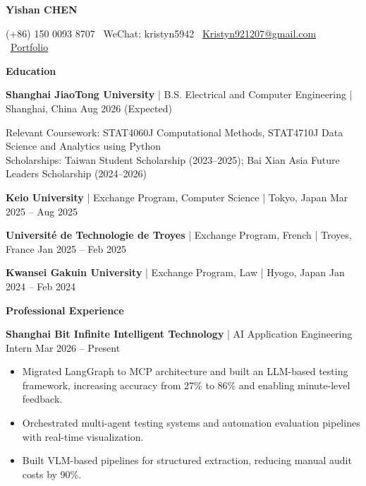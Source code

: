 \documentclass[11pt]{article}
\begin{document}
\begin{center}
    \textbf{\large Yishan CHEN}
\end{center}

\vspace{-20pt}
\begin{center}
    (+86) 150 0093 8707 \textbullet\
    WeChat: kristyn5942 \textbullet\
    \href{mailto:Kristyn921207@gmail.com}{Kristyn921207@gmail.com} \textbullet\
    \href{https://kristynchen.github.io/Personal-Website/}{Portfolio}
\end{center}

\vspace{-10pt}
\begin{center}
    \textbf{Education} \\
    \vspace{-5pt}
    \hrulefill
\end{center}
\vspace{-5pt}

\textbf{Shanghai JiaoTong University} | B.S. Electrical and Computer Engineering | Shanghai, China 
\hfill Aug 2026 (Expected)

Relevant Coursework: STAT4060J Computational Methods, STAT4710J Data Science and Analytics using Python \\
Scholarships: Taiwan Student Scholarship (2023--2025); Bai Xian Asia Future Leaders Scholarship (2024--2026)

\vspace{2pt}
\textbf{Keio University} | Exchange Program, Computer Science | Tokyo, Japan 
\hfill Mar 2025 -- Aug 2025  

\vspace{2pt}
\textbf{Université de Technologie de Troyes} | Exchange Program, French | Troyes, France 
\hfill Jan 2025 -- Feb 2025  

\vspace{2pt}
\textbf{Kwansei Gakuin University} | Exchange Program, Law | Hyogo, Japan 
\hfill Jan 2024 -- Feb 2024

\vspace{-5pt}
\begin{center}
    \textbf{Professional Experience} \\
    \vspace{-5pt}
    \hrulefill
\end{center}
\vspace{-5pt}

\textbf{Shanghai Bit Infinite Intelligent Technology} | AI Application Engineering Intern \hfill Mar 2026 -- Present  
\begin{itemize}[itemsep=0pt, parsep=0pt, topsep=0pt, partopsep=0pt, leftmargin=15pt]
    \item Migrated LangGraph to MCP architecture and built an LLM-based testing framework, increasing accuracy from 27\% to 86\% and enabling minute-level feedback.
    \item Orchestrated multi-agent testing systems and automation evaluation pipelines with real-time visualization.
    \item Built VLM-based pipelines for structured extraction, reducing manual audit costs by 90\%.
\end{itemize}
\end{document}
